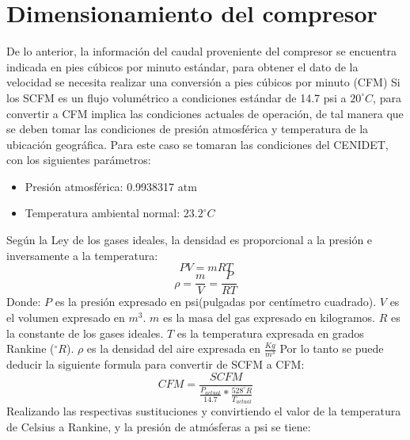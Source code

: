 \section{Dimensionamiento del compresor}
De lo anterior, la informaci\'on del caudal proveniente del compresor se encuentra indicada en pies c\'ubicos por minuto estándar, para obtener el dato de la velocidad se necesita realizar una conversi\'on a pies cúbicos por minuto (CFM)
\newline
Si los SCFM es un flujo volum\'etrico a condiciones estándar de 14.7 psi a $20^\circ C$, para convertir a CFM implica las condiciones actuales de operaci\'on, de tal manera que se deben tomar las condiciones de presi\'on atmosférica y temperatura de la ubicación geográfica. Para este caso se tomaran las condiciones del CENIDET, con los siguientes parámetros:
\begin{itemize}
	\item Presión atmosférica: 0.9938317 atm
	\item Temperatura ambiental normal: $23.2^\circ C$
\end{itemize}
Según la Ley de los gases ideales, la densidad es proporcional a la presión e inversamente a la temperatura\cite{Cengel2022}:
\begin{equation}
	PV=mRT
\end{equation}
\begin{equation}
	\rho=\frac{m}{V}=\frac{P}{RT}
\end{equation}
Donde:
\newline
$P$ es la presión expresado en psi(pulgadas por centímetro cuadrado).
\newline
$V$ es el volumen expresado en $m^3$.
\newline
$m$ es la masa del gas expresado en kilogramos.
\newline
$R$ es la constante de los gases ideales.
\newline
$T$ es la temperatura expresada en grados Rankine ($^\circ R$).
\newline
$\rho$ es la densidad del aire expresada en $\frac{Kg}{m^3}$
\newline
Por lo tanto se puede deducir la siguiente formula para convertir de SCFM a CFM:
\begin{equation}
	CFM=\frac{SCFM}{\frac{P_{actual}}{14.7}*\frac{528^\circ R}{T_{actual}}}
\end{equation}
Realizando las respectivas sustituciones y convirtiendo el valor de la temperatura de Celsius a  Rankine, y la presi\'on de atmósferas a psi se tiene:

